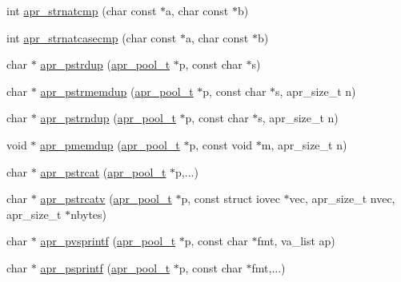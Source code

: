 \begin{DoxyCompactItemize}
\item 
int \hyperlink{group__apr__strings_gabe7e226c26e1535d787a7836b9c8d0a1}{apr\+\_\+strnatcmp} (char const $\ast$a, char const $\ast$b)
\item 
int \hyperlink{group__apr__strings_ga1708d51c4989934fec663b23366430f3}{apr\+\_\+strnatcasecmp} (char const $\ast$a, char const $\ast$b)
\item 
char $\ast$ \hyperlink{group__apr__strings_gabc79e99ff19abbd7cfd18308c5f85d47}{apr\+\_\+pstrdup} (\hyperlink{group__apr__pools_gaf137f28edcf9a086cd6bc36c20d7cdfb}{apr\+\_\+pool\+\_\+t} $\ast$p, const char $\ast$s)
\item 
char $\ast$ \hyperlink{group__apr__strings_ga0eae1185559578c0f9792413305eca25}{apr\+\_\+pstrmemdup} (\hyperlink{group__apr__pools_gaf137f28edcf9a086cd6bc36c20d7cdfb}{apr\+\_\+pool\+\_\+t} $\ast$p, const char $\ast$s, apr\+\_\+size\+\_\+t n)
\item 
char $\ast$ \hyperlink{group__apr__strings_gad17053ffe6604d908ae7cac33543a6b4}{apr\+\_\+pstrndup} (\hyperlink{group__apr__pools_gaf137f28edcf9a086cd6bc36c20d7cdfb}{apr\+\_\+pool\+\_\+t} $\ast$p, const char $\ast$s, apr\+\_\+size\+\_\+t n)
\item 
void $\ast$ \hyperlink{group__apr__strings_gac3886f14ecf5aed8fe4493087799685c}{apr\+\_\+pmemdup} (\hyperlink{group__apr__pools_gaf137f28edcf9a086cd6bc36c20d7cdfb}{apr\+\_\+pool\+\_\+t} $\ast$p, const void $\ast$m, apr\+\_\+size\+\_\+t n)
\item 
char $\ast$ \hyperlink{group__apr__strings_ga7bd80c95ffb7b3f96bc78e7b5b5b0045}{apr\+\_\+pstrcat} (\hyperlink{group__apr__pools_gaf137f28edcf9a086cd6bc36c20d7cdfb}{apr\+\_\+pool\+\_\+t} $\ast$p,...)
\item 
char $\ast$ \hyperlink{group__apr__strings_ga15d0853af252a894e288c682b8f84309}{apr\+\_\+pstrcatv} (\hyperlink{group__apr__pools_gaf137f28edcf9a086cd6bc36c20d7cdfb}{apr\+\_\+pool\+\_\+t} $\ast$p, const struct iovec $\ast$vec, apr\+\_\+size\+\_\+t nvec, apr\+\_\+size\+\_\+t $\ast$nbytes)
\item 
char $\ast$ \hyperlink{group__apr__strings_ga05248544edebc71070140d2ce5969c10}{apr\+\_\+pvsprintf} (\hyperlink{group__apr__pools_gaf137f28edcf9a086cd6bc36c20d7cdfb}{apr\+\_\+pool\+\_\+t} $\ast$p, const char $\ast$fmt, va\+\_\+list ap)
\item 
char $\ast$ \hyperlink{group__apr__strings_ga3eca76b8d293c5c3f8021e45eda813d8}{apr\+\_\+psprintf} (\hyperlink{group__apr__pools_gaf137f28edcf9a086cd6bc36c20d7cdfb}{apr\+\_\+pool\+\_\+t} $\ast$p, const char $\ast$fmt,...)

\end{DoxyCompactItemize}

